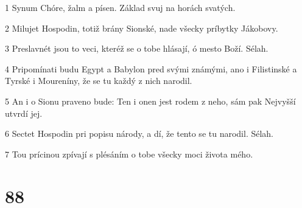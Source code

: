 \par 1 Synum Chóre, žalm a písen. Základ svuj na horách svatých.
\par 2 Milujet Hospodin, totiž brány Sionské, nade všecky príbytky Jákobovy.
\par 3 Preslavnét jsou to veci, kteréž se o tobe hlásají, ó mesto Boží. Sélah.
\par 4 Pripomínati budu Egypt a Babylon pred svými známými, ano i Filistinské a Tyrské i Moureníny, že se tu každý z nich narodil.
\par 5 An i o Sionu praveno bude: Ten i onen jest rodem z neho, sám pak Nejvyšší utvrdí jej.
\par 6 Sectet Hospodin pri popisu národy, a dí, že tento se tu narodil. Sélah.
\par 7 Tou prícinou zpívají s plésáním o tobe všecky moci života mého.

\chapter{88}

